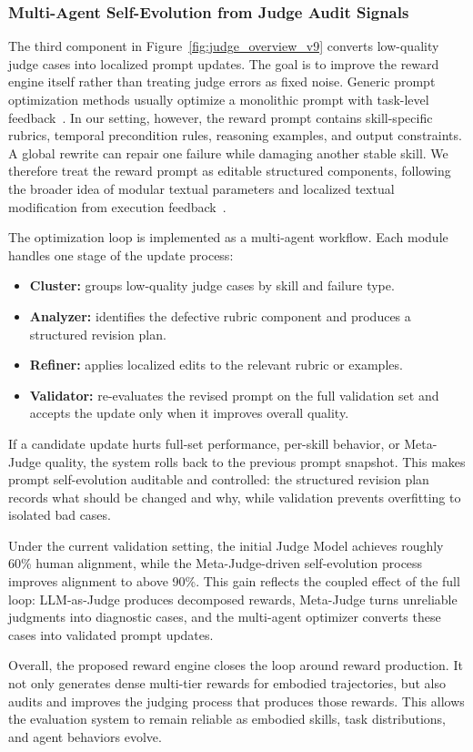 \subsubsection{Multi-Agent Self-Evolution from Judge Audit Signals}
\label{subsec:structured_reward_optimization}

The third component in Figure~\ref{fig:judge_overview_v9} converts low-quality judge cases into localized prompt updates. The goal is to improve the reward engine itself rather than treating judge errors as fixed noise. Generic prompt optimization methods usually optimize a monolithic prompt with task-level feedback~\citep{yang2024opro,khattab2023dspy}. In our setting, however, the reward prompt contains skill-specific rubrics, temporal precondition rules, reasoning examples, and output constraints. A global rewrite can repair one failure while damaging another stable skill. We therefore treat the reward prompt as editable structured components, following the broader idea of modular textual parameters and localized textual modification from execution feedback~\citep{he2026learning}.

The optimization loop is implemented as a multi-agent workflow. Each module handles one stage of the update process:
\begin{itemize}
    \item \textbf{Cluster:} groups low-quality judge cases by skill and failure type.
    \item \textbf{Analyzer:} identifies the defective rubric component and produces a structured revision plan.
    \item \textbf{Refiner:} applies localized edits to the relevant rubric or examples.
    \item \textbf{Validator:} re-evaluates the revised prompt on the full validation set and accepts the update only when it improves overall quality.
\end{itemize}

If a candidate update hurts full-set performance, per-skill behavior, or Meta-Judge quality, the system rolls back to the previous prompt snapshot. This makes prompt self-evolution auditable and controlled: the structured revision plan records what should be changed and why, while validation prevents overfitting to isolated bad cases.

Under the current validation setting, the initial Judge Model achieves roughly 60\% human alignment, while the Meta-Judge-driven self-evolution process improves alignment to above 90\%. This gain reflects the coupled effect of the full loop: LLM-as-Judge produces decomposed rewards, Meta-Judge turns unreliable judgments into diagnostic cases, and the multi-agent optimizer converts these cases into validated prompt updates.

Overall, the proposed reward engine closes the loop around reward production. It not only generates dense multi-tier rewards for embodied trajectories, but also audits and improves the judging process that produces those rewards. This allows the evaluation system to remain reliable as embodied skills, task distributions, and agent behaviors evolve.
